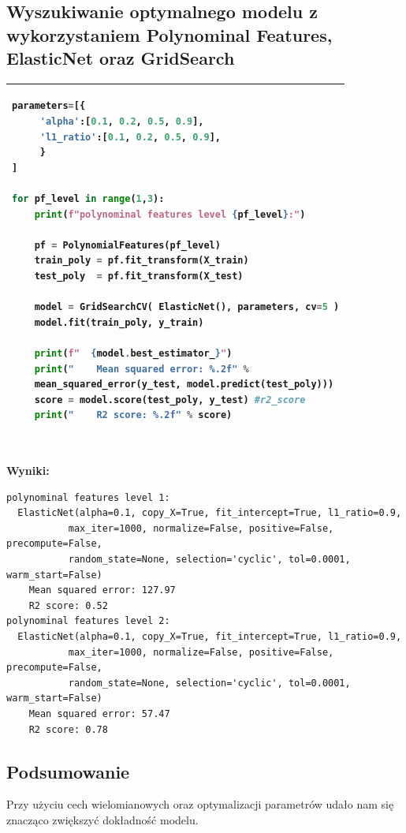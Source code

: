 \documentclass[11pt, a4paper]{article}
\begin{document}
\subsection{Wyszukiwanie optymalnego modelu z wykorzystaniem Polynominal Features, ElasticNet oraz GridSearch}

    \vspace{0.5cm} 
    \begin{tabular}{|l|}
        \hline
        \begin{lstlisting}[language=Python]
parameters=[{
     'alpha':[0.1, 0.2, 0.5, 0.9], 
     'l1_ratio':[0.1, 0.2, 0.5, 0.9],
     }
]
 
for pf_level in range(1,3):
    print(f"polynominal features level {pf_level}:")

    pf = PolynomialFeatures(pf_level)
    train_poly = pf.fit_transform(X_train)
    test_poly  = pf.fit_transform(X_test)
    
    model = GridSearchCV( ElasticNet(), parameters, cv=5 )
    model.fit(train_poly, y_train)

    print(f"  {model.best_estimator_}")
    print("    Mean squared error: %.2f" % 
    mean_squared_error(y_test, model.predict(test_poly)))
    score = model.score(test_poly, y_test) #r2_score
    print("    R2 score: %.2f" % score)
        \end{lstlisting}
        \\ \hline
    \end{tabular}
    \vspace{0.5cm} \\
    
    \textbf{Wyniki:}\\
 \begin{verbatim}
polynominal features level 1:
  ElasticNet(alpha=0.1, copy_X=True, fit_intercept=True, l1_ratio=0.9,
           max_iter=1000, normalize=False, positive=False, precompute=False,
           random_state=None, selection='cyclic', tol=0.0001, warm_start=False)
    Mean squared error: 127.97
    R2 score: 0.52
polynominal features level 2:
  ElasticNet(alpha=0.1, copy_X=True, fit_intercept=True, l1_ratio=0.9,
           max_iter=1000, normalize=False, positive=False, precompute=False,
           random_state=None, selection='cyclic', tol=0.0001, warm_start=False)
    Mean squared error: 57.47
    R2 score: 0.78
\end{verbatim}

\subsection{Podsumowanie}
Przy użyciu cech wielomianowych oraz optymalizacji parametrów udało nam się znacząco zwiększyć dokładność modelu.
\end{document}

